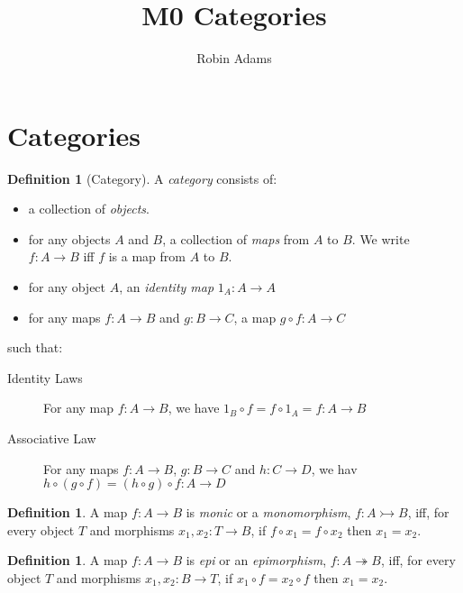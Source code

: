 \documentclass{article}
\title{M0 Categories}
\author{Robin Adams}
\theoremstyle{definition}
\newtheorem{definition}[axiom]{Definition}
\begin{document}
\maketitle
\tableofcontents

\section{Categories}

\begin{definition}[Category]
    A \emph{category} consists of:
    \begin{itemize}
        \item a collection of \emph{objects}.
        \item for any objects $A$ and $B$, a collection of \emph{maps} from $A$ to $B$. We write $f : A \rightarrow B$
        iff $f$ is a map from $A$ to $B$.
        \item for any object $A$, an \emph{identity map} $1_A : A \rightarrow A$
        \item for any maps $f : A \rightarrow B$ and $g : B \rightarrow C$, a map $g \circ f : A \rightarrow C$
    \end{itemize}
    such that:
    \begin{description}
        \item[Identity Laws]
        For any map $f : A \rightarrow B$, we have $1_B \circ f = f \circ 1_A = f : A \rightarrow B$
        \item[Associative Law]
        For any maps $f : A \rightarrow B$, $g : B \rightarrow C$ and $h : C \rightarrow D$, we hav
        $h \circ (g \circ f) = (h \circ g) \circ f : A \rightarrow D$ 
    \end{description}
\end{definition}

\begin{definition}
    A map $f : A \rightarrow B$ is \emph{monic} or a \emph{monomorphism}, $f : A \rightarrowtail B$,
    iff, for every object $T$ and morphisms $x_1, x_2 : T \rightarrow B$, if $f \circ x_1 = f \circ x_2$
    then $x_1 = x_2$.
\end{definition}

\begin{definition}
    A map $f : A \rightarrow B$ is \emph{epi} or an \emph{epimorphism}, $f : A \twoheadrightarrow B$,
    iff, for every object $T$ and morphisms $x_1, x_2 : B \rightarrow T$, if $x_1 \circ f = x_2 \circ f$
    then $x_1 = x_2$.
\end{definition}
\end{document}
